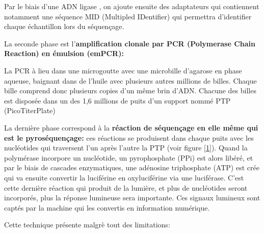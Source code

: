 \documentclass[a4paper,11pt,twoside]{report}
\begin{document}
Par le biais d'une ADN ligase \citep{sengenes2012developpement}, on ajoute ensuite des adaptateurs qui contiennent notamment une séquence MID (Multipled IDentifier) qui permettra d'identifier chaque échantillon lors du séquençage. \citep{Margulies2005aa}

La seconde phase est l'\textbf{amplification clonale par PCR (Polymerase Chain Reaction) en émulsion (emPCR):}

La PCR à lieu dans une microgoutte avec une microbille d'agarose en phase aqueuse, baignant dans de l'huile avec plusieurs autres millions de billes. Chaque bille comprend donc plusieurs copies d'un même brin d'ADN. Chacune des billes est disposée dans un des 1,6 millions de puits d'un support nommé PTP (PicoTiterPlate) \citep{sengenes2012developpement}

La dernière phase correspond à la \textbf{réaction de séquençage en elle même qui est le pyroséquençage:} ces réactions se produisent dans chaque puits avec les nucléotides qui traversent l'un après l'autre la PTP (voir figure \ref{1}). Quand la polymérase incorpore un nucléotide, un pyrophosphate (PPi) est alors libéré, et par le biais de cascades enzymatiques, une adénosine triphosphate (ATP) est crée qui va ensuite convertir la luciférine en oxyluciférine via une luciférase. C'est cette dernière réaction qui produit de la lumière, et plus de nucléotides seront incorporés, plus la réponse lumineuse sera importante. Ces signaux lumineux sont captés par la machine qui les convertis en information numérique. \citep{sengenes2012developpement}

Cette technique présente malgrè tout des limitations:
\end{document}
